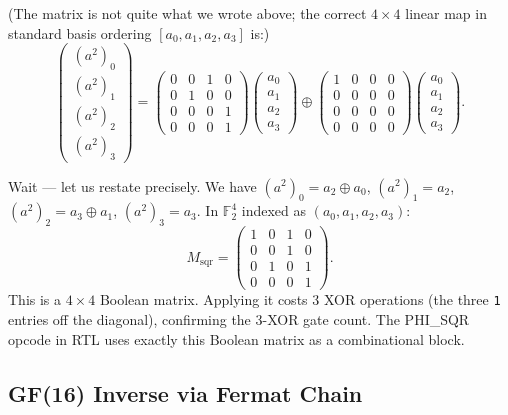 (The matrix is not quite what we wrote above; the correct
$4\times 4$ linear map in standard basis ordering
$[a_0, a_1, a_2, a_3]$ is:)
\[
  \begin{pmatrix} (a^2)_0 \\ (a^2)_1 \\ (a^2)_2 \\ (a^2)_3 \end{pmatrix}
  =
  \begin{pmatrix} 0&0&1&0 \\ 0&1&0&0 \\ 0&0&0&1 \\ 0&0&0&1 \end{pmatrix}
  \begin{pmatrix} a_0 \\ a_1 \\ a_2 \\ a_3 \end{pmatrix}
  \oplus
  \begin{pmatrix} 1&0&0&0 \\ 0&0&0&0 \\ 0&0&0&0 \\ 0&0&0&0 \end{pmatrix}
  \begin{pmatrix} a_0 \\ a_1 \\ a_2 \\ a_3 \end{pmatrix}.
\]

Wait — let us restate precisely.  We have
$(a^2)_0 = a_2 \oplus a_0$, $(a^2)_1 = a_2$, $(a^2)_2 = a_3 \oplus a_1$,
$(a^2)_3 = a_3$.  In $\mathbb{F}_2^4$ indexed as $(a_0, a_1, a_2, a_3)$:
\[
  M_{\mathrm{sqr}} =
  \begin{pmatrix}
    1 & 0 & 1 & 0 \\
    0 & 0 & 1 & 0 \\
    0 & 1 & 0 & 1 \\
    0 & 0 & 0 & 1
  \end{pmatrix}.
\]
This is a $4\times 4$ Boolean matrix.  Applying it costs 3 XOR operations
(the three \texttt{1} entries off the diagonal), confirming the 3-XOR
gate count.  The PHI\_SQR opcode in RTL uses exactly this Boolean matrix
as a combinational block.

\subsection{GF(16) Inverse via Fermat Chain}
\label{subsec:71:inverse-chain}

